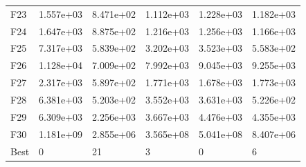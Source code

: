\begin{tabular}{llllll}
F23  &  1.557e+03 &  8.471e+02 &  1.112e+03 &  1.228e+03 &  1.182e+03 \\
F24  &  1.647e+03 &  8.875e+02 &  1.216e+03 &  1.256e+03 &  1.166e+03 \\
F25  &  7.317e+03 &  5.839e+02 &  3.202e+03 &  3.523e+03 &  5.583e+02 \\
F26  &  1.128e+04 &  7.009e+02 &  7.992e+03 &  9.045e+03 &  9.255e+03 \\
F27  &  2.317e+03 &  5.897e+02 &  1.771e+03 &  1.678e+03 &  1.773e+03 \\
F28  &  6.381e+03 &  5.203e+02 &  3.552e+03 &  3.631e+03 &  5.226e+02 \\
F29  &  6.309e+03 &  2.256e+03 &  3.667e+03 &  4.476e+03 &  4.355e+03 \\
F30  &  1.181e+09 &  2.855e+06 &  3.565e+08 &  5.041e+08 &  8.407e+06 \\
Best &          0 &         21 &          3 &          0 &          6 \\
\bottomrule
\end{tabular}
